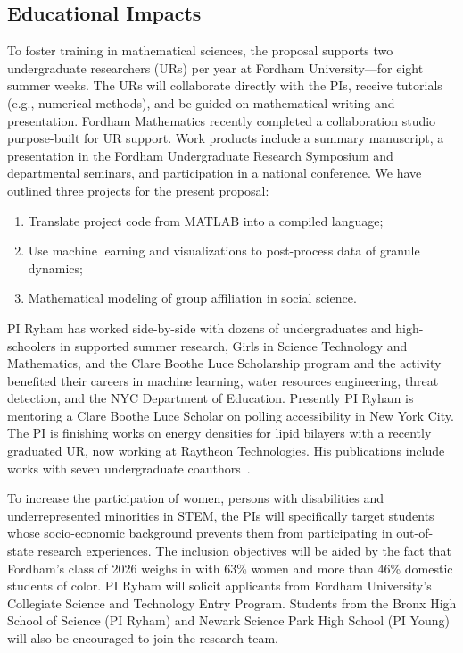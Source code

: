 \subsection{Educational Impacts}
\label{subsec:Educational_plans}
To foster training in mathematical sciences, the proposal supports two
undergraduate researchers (URs) per year at Fordham University---for
eight summer weeks. The URs will collaborate directly with the PIs,
receive tutorials (e.g., numerical methods), and be guided on
mathematical writing and presentation. Fordham Mathematics recently
completed a collaboration studio purpose-built for UR support. Work
products include a summary manuscript, a presentation in the Fordham
Undergraduate Research Symposium and departmental seminars, and
participation in a national conference. We have outlined three projects
for the present proposal:
\begin{enumerate}[noitemsep,topsep=0pt]
  \item Translate project code from MATLAB into a compiled language;
  \item Use machine learning and visualizations to post-process data of
    granule dynamics;
  \item Mathematical modeling of group affiliation in social science.
\end{enumerate}
PI Ryham has worked side-by-side with dozens of undergraduates and
high-schoolers in supported summer research, Girls in Science Technology
and Mathematics, and the Clare Boothe Luce Scholarship program and the
activity benefited their careers in machine learning, water resources
engineering, threat detection, and the NYC Department of Education.
Presently PI Ryham is mentoring a Clare Boothe Luce Scholar on polling
accessibility in New York City. The PI is finishing works on energy
densities for lipid bilayers with a recently graduated UR, now working
at Raytheon Technologies. His publications include works with seven
undergraduate coauthors~\cite{Figueroa2012CuttingCI, RYHAM20112929,
RyWaCo13, RyKlYaCo16}.

To increase the participation of women, persons with disabilities and
underrepresented minorities in STEM, the PIs will specifically target
students whose socio-economic background prevents them from
participating in out-of-state research experiences. The inclusion
objectives will be aided by the fact that Fordham's class of 2026 weighs
in with 63\% women and more than 46\% domestic students of color. PI
Ryham will solicit applicants from Fordham University's Collegiate
Science and Technology Entry Program. Students from the Bronx High
School of Science (PI Ryham) and Newark Science Park High School (PI
Young) will also be encouraged to join the research team. 

